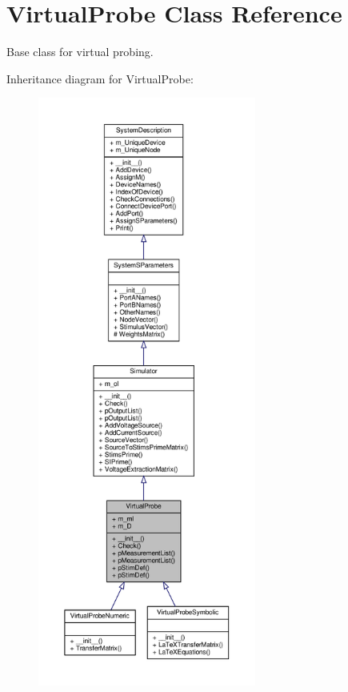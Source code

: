 \hypertarget{classSignalIntegrity_1_1SystemDescriptions_1_1VirtualProbe_1_1VirtualProbe}{}\section{Virtual\+Probe Class Reference}
\label{classSignalIntegrity_1_1SystemDescriptions_1_1VirtualProbe_1_1VirtualProbe}


Base class for virtual probing.  




Inheritance diagram for Virtual\+Probe\+:
\nopagebreak
\begin{figure}[H]
\begin{center}
\leavevmode
\includegraphics[height=550pt]{classSignalIntegrity_1_1SystemDescriptions_1_1VirtualProbe_1_1VirtualProbe__inherit__graph}
\end{center}
\end{figure}


